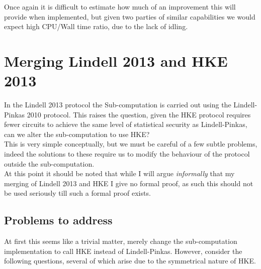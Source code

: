 \documentclass[ %
                    author={Nicholas Tutte},
                supervisor={Prof. Nigel Smart},
                    degree={MEng},
                     title={Secure Two Party Computation},
                  subtitle={A practical comparison of recent protocols},
                      type={Research - GG1K},
                      year={2015} ]{dissertation}
\begin{document}
				Once again it is difficult to estimate how much of an improvement this will provide when implemented, but given two parties of similar capabilities we would expect high CPU/Wall time ratio, due to the lack of idling.


		\section{Merging Lindell 2013 and HKE 2013}
			In the Lindell 2013 protocol the Sub-computation is carried out using the Lindell-Pinkas 2010 protocol. This raises the question, given the HKE protocol requires fewer circuits to achieve the same level of statistical security as Lindell-Pinkas, can we alter the sub-computation to use HKE?\\

			This is very simple conceptually, but we must be careful of a few subtle problems, indeed the solutions to these require us to modify the behaviour of the protocol outside the sub-computation.\\

			At this point it should be noted that while I will argue \emph{informally} that my merging of Lindell 2013 and HKE I give no formal proof, as such this should not be used seriously till such a formal proof exists.

			\subsection{Problems to address}
				At first this seems like a trivial matter, merely change the sub-computation implementation to call HKE instead of Lindell-Pinkas. However, consider the following questions, several of which arise due to the symmetrical nature of HKE.
\end{document}

